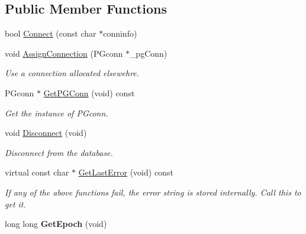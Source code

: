 \subsection*{Public Member Functions}
\begin{DoxyCompactItemize}
\item 
bool \hyperlink{class_postgre_s_q_l_interface_a76c4ebdbd06ee57a4c69e5778c362724}{Connect} (const char $\ast$conninfo)
\item 
\hypertarget{class_postgre_s_q_l_interface_a761568edccdc320383683da86c5dfe7e}{void \hyperlink{class_postgre_s_q_l_interface_a761568edccdc320383683da86c5dfe7e}{Assign\-Connection} (P\-Gconn $\ast$\-\_\-pg\-Conn)}\label{class_postgre_s_q_l_interface_a761568edccdc320383683da86c5dfe7e}

\begin{DoxyCompactList}\small\item\em Use a connection allocated elsewehre. \end{DoxyCompactList}\item 
\hypertarget{class_postgre_s_q_l_interface_ad8a87839a70b64902f78063211e2e769}{P\-Gconn $\ast$ \hyperlink{class_postgre_s_q_l_interface_ad8a87839a70b64902f78063211e2e769}{Get\-P\-G\-Conn} (void) const }\label{class_postgre_s_q_l_interface_ad8a87839a70b64902f78063211e2e769}

\begin{DoxyCompactList}\small\item\em Get the instance of P\-Gconn. \end{DoxyCompactList}\item 
\hypertarget{class_postgre_s_q_l_interface_a62e68986cdc1e9eb2f308bdc135570ca}{void \hyperlink{class_postgre_s_q_l_interface_a62e68986cdc1e9eb2f308bdc135570ca}{Disconnect} (void)}\label{class_postgre_s_q_l_interface_a62e68986cdc1e9eb2f308bdc135570ca}

\begin{DoxyCompactList}\small\item\em Disconnect from the database. \end{DoxyCompactList}\item 
\hypertarget{class_postgre_s_q_l_interface_a6ecf3b86569fd0cdbc995b2ad0a6ee2b}{virtual const char $\ast$ \hyperlink{class_postgre_s_q_l_interface_a6ecf3b86569fd0cdbc995b2ad0a6ee2b}{Get\-Last\-Error} (void) const }\label{class_postgre_s_q_l_interface_a6ecf3b86569fd0cdbc995b2ad0a6ee2b}

\begin{DoxyCompactList}\small\item\em If any of the above functions fail, the error string is stored internally. Call this to get it. \end{DoxyCompactList}\item 
\hypertarget{class_postgre_s_q_l_interface_a7e0d635dd6f48c173568c738d9a5f10e}{long long {\bfseries Get\-Epoch} (void)}\label{class_postgre_s_q_l_interface_a7e0d635dd6f48c173568c738d9a5f10e}


\end{DoxyCompactItemize}
